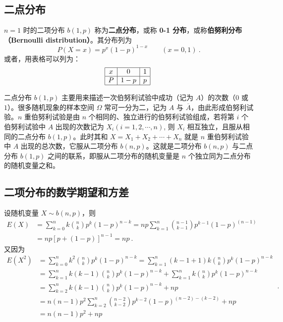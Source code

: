 \subsection{二点分布}
$n=1$ 时的二项分布 $b (1 ,p)$ 称为\textbf{二点分布}，或称 \textbf{0-1 分布}，或称\textbf{伯努利分布（Bernoulli distribution）}。其分布列为
\begin{equation}
P(X=x)=p^{x}(1-p)^{1-x} \qquad (x=0,1)~.
\end{equation}
或者，用表格可以列为：
\begin{equation}
\begin{array}{|c|c|c|}\hline x & 0 & 1 \\ \hline P & 1-p & p \\ \hline  \end{array}~
\end{equation}


二点分布 $b(1 ,p) $ 主要用来描述一次伯努利试验中成功（记为 $A$）的次数（$0$ 或 $1$）。很多随机现象的样本空间 $\Omega$ 常可一分为二，记为 $A $ 与 $\overline A$，由此形成伯努利试验。$n $ 重伯努利试验是由 $n $ 个相同的、独立进行的伯努利试验组成，若将第 $i $ 个伯努利试验中 $A $ 出现的次数记为 $X_i (i= 1,2, \cdots, n)$, 则 $X_i$ 相互独立，且服从相同的二点分布 $b(1 ,p)$。此时其和 $X=X_1+X_2+\cdots+X_n$ 就是 $n $ 重伯努利试验中 $A $ 出现的总次数，它服从二项分布 $b(n,p)$。这就是二项分布 $b (n ,p) $ 与二点分布 $b(1,p)$ 之间的联系，即服从二项分布的随机变量是 $n$ 个独立同为二点分布的随机变量之和。

\subsection{二项分布的数学期望和方差}

设随机变量 $X\sim b(n,p)$，则
\begin{equation}
\begin{aligned} E(X) &=\sum_{k=0}^{n} k\binom{n}{k} p^{k}(1-p)^{n-k}=n p \sum_{k=1}^{n}\binom{n-1}{k-1} p^{k-1}(1-p)^{(n-1)} \\ &=n p[p+(1-p)]^{n-1}=n p~.\end{aligned}
\end{equation}
又因为
\begin{equation}
\begin{aligned} E\left(X^{2}\right) &=\sum_{k=0}^{n} k^{2}\binom{n}{k} p^{k}(1-p)^{n-k}=\sum_{k=1}^{n}(k-1+1) k\binom{n}{k} p^{k}(1-p)^{n-k} \\ &=\sum_{k=1}^{n} k(k-1)\binom{n}{k} p^{k}(1-p)^{n-k}+\sum_{k=1}^{n} k\binom{n}{k} p^{k}(1-p)^{n-k} \\ &=\sum_{k=2}^{n} k(k-1)\binom{n}{k} p^{k}(1-p)^{n-k}+n p \\ &=n(n-1) p^{2} \sum_{k=2}^{n}\binom{n-2}{k-2} p^{k-2}(1-p)^{(n-2)-(k-2)}+n p \\ &=n(n-1) p^{2}+n p \end{aligned}~.
\end{equation}

